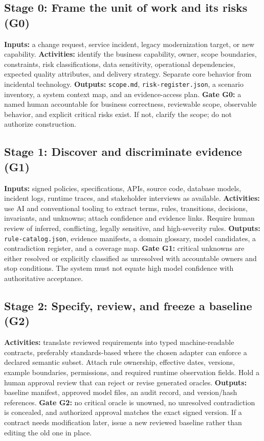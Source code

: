 \documentclass[11pt,a4paper]{article}
\begin{document}
\subsection{Stage 0: Frame the unit of work and its risks (G0)}
\textbf{Inputs:} a change request, service incident, legacy modernization target, or new capability. \textbf{Activities:} identify the business capability, owner, scope boundaries, constraints, risk classifications, data sensitivity, operational dependencies, expected quality attributes, and delivery strategy. Separate core behavior from incidental technology. \textbf{Outputs:} \texttt{scope.md}, \texttt{risk-register.json}, a scenario inventory, a system context map, and an evidence-access plan. \textbf{Gate G0:} a named human accountable for business correctness, reviewable scope, observable behavior, and explicit critical risks exist. If not, clarify the scope; do not authorize construction.

\subsection{Stage 1: Discover and discriminate evidence (G1)}
\textbf{Inputs:} signed policies, specifications, APIs, source code, database models, incident logs, runtime traces, and stakeholder interviews as available. \textbf{Activities:} use AI and conventional tooling to extract terms, rules, transitions, decisions, invariants, and unknowns; attach confidence and evidence links. Require human review of inferred, conflicting, legally sensitive, and high-severity rules. \textbf{Outputs:} \texttt{rule-catalog.json}, evidence manifests, a domain glossary, model candidates, a contradiction register, and a coverage map. \textbf{Gate G1:} critical unknowns are either resolved or explicitly classified as unresolved with accountable owners and stop conditions. The system must not equate high model confidence with authoritative acceptance.

\subsection{Stage 2: Specify, review, and freeze a baseline (G2)}
\textbf{Activities:} translate reviewed requirements into typed machine-readable contracts, preferably standards-based where the chosen adapter can enforce a declared semantic subset. Attach rule ownership, effective dates, versions, example boundaries, permissions, and required runtime observation fields. Hold a human approval review that can reject or revise generated oracles. \textbf{Outputs:} baseline manifest, approved model files, an audit record, and version/hash references. \textbf{Gate G2:} no critical oracle is unowned, no unresolved contradiction is concealed, and authorized approval matches the exact signed version. If a contract needs modification later, issue a new reviewed baseline rather than editing the old one in place.
\end{document}

